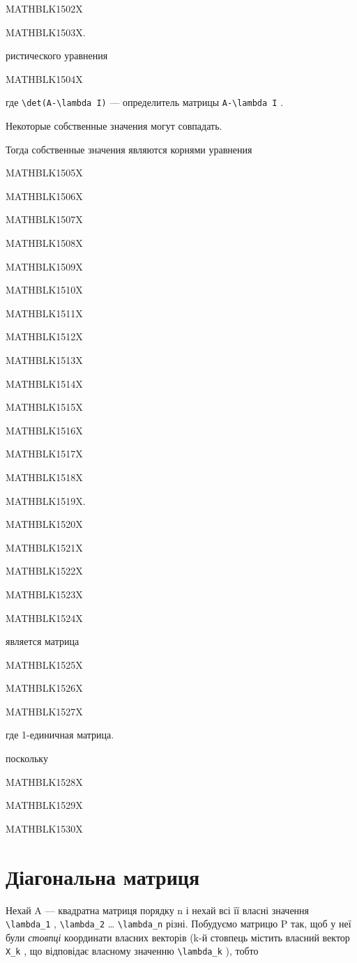 \documentclass[
  ukrainian,
]{article}
\begin{document}
MATHBLK1502X

MATHBLK1503X.

ристического уравнения

MATHBLK1504X

где \texttt{\textbackslash{}det(A-\textbackslash{}lambda\ I)} ---
определитель матрицы \texttt{A-\textbackslash{}lambda\ I} .

Некоторые собственные значения могут совпадать.

Тогда собственные значения являются корнями уравнения

MATHBLK1505X

MATHBLK1506X

MATHBLK1507X

MATHBLK1508X

MATHBLK1509X

MATHBLK1510X

MATHBLK1511X

MATHBLK1512X

MATHBLK1513X

MATHBLK1514X

MATHBLK1515X

MATHBLK1516X

MATHBLK1517X

MATHBLK1518X

MATHBLK1519X.

MATHBLK1520X

MATHBLK1521X

MATHBLK1522X

MATHBLK1523X

MATHBLK1524X

является матрица

MATHBLK1525X

MATHBLK1526X

MATHBLK1527X

где 1-единичная матрица.

поскольку

MATHBLK1528X

MATHBLK1529X

MATHBLK1530X

\section{Діагональна
матриця}\label{ux434ux456ux430ux433ux43eux43dux430ux43bux44cux43dux430-ux43cux430ux442ux440ux438ux446ux44f}

Нехай A --- квадратна матриця порядку n і нехай всі її власні значення
\texttt{\textbackslash{}lambda\_1} , \texttt{\textbackslash{}lambda\_2}
\ldots{} \texttt{\textbackslash{}lambda\_n} різні. Побудуємо матрицю P
так, щоб у неї були \emph{стовпці} координати власних векторів (k-й
стовпець містить власний вектор \texttt{X\_k} , що відповідає власному
значенню \texttt{\textbackslash{}lambda\_k} ), тобто
\end{document}
